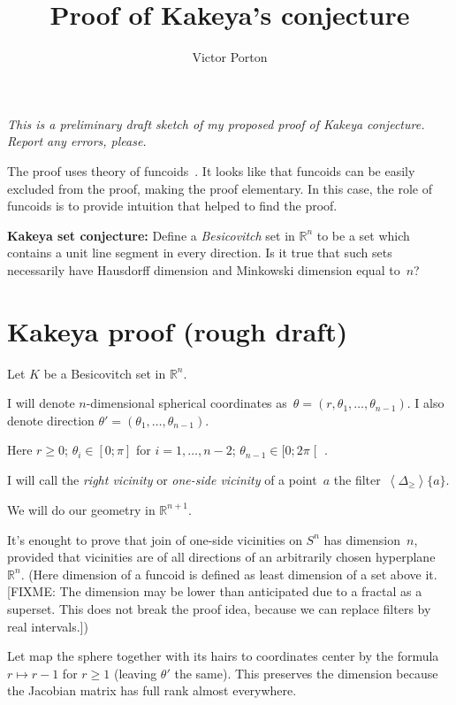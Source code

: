 \documentclass{amsart}
\title{Proof of Kakeya's conjecture}
\author{Victor Porton}
\newcommand{\supfun}[1]{\left\langle#1\right\rangle}
\begin{document}
\maketitle  

\emph{This is a preliminary draft sketch of my proposed proof of Kakeya conjecture. Report any errors, please.}

The proof uses theory of funcoids~\cite{volume-1}. It looks like that funcoids can be easily excluded from the proof, making the proof elementary. In this case, the role of funcoids is to provide intuition that helped to find the proof.

\textbf{Kakeya set conjecture:} Define a \emph{Besicovitch} set in $\mathbb{R}^n$ to be a set which contains a unit line segment in every direction. Is it true that such sets necessarily have Hausdorff dimension and Minkowski dimension equal to~$n$?

\section{Kakeya proof (rough draft)}

Let $K$ be a Besicovitch set in $\mathbb{R}^n$.

I will denote $n$-dimensional spherical coordinates as~$\theta=(r, \theta_1,\dots,\theta_{n-1})$.
I also denote direction $\theta'=(\theta_1,\dots,\theta_{n-1})$.

Here $r\geq 0$; $\theta_i\in[0;\pi]$ for $i=1,\dots,n-2$; $\theta_{n-1}\in[0;2\pi\mathclose[$ .

I will call the \emph{right vicinity} or \emph{one-si\-de vicinity} of a point~$a$ the filter~$\supfun{\Delta_{\geq}}\{a\}$.

We will do our geometry in $\mathbb{R}^{n+1}$.

It's enought to prove that join of one-si\-de vicinities on $S^n$ has dimension~$n$, provided that vicinities are of all directions
of an arbitrarily chosen hyperplane~$\mathbb{R}^n$.
(Here dimension of a funcoid is defined as least dimension of a set above it.
[FIXME: The dimension may be lower than anticipated due to a fractal as a superset.
This does not break the proof idea, because we can replace filters by real intervals.])

Let map the sphere together with its hairs to coordinates center by the formula $r\mapsto r-1$ for $r\geq 1$ (leaving $\theta'$ the same).
This preserves the dimension because the Jacobian matrix has full rank almost everywhere.
\end{document}
